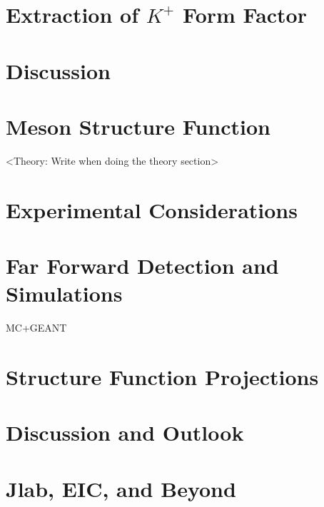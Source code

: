 \documentclass[
]{report}
\begin{document}
\hypertarget{Section-8.4}{%
\section{\texorpdfstring{Extraction of \(K^{+}\) Form
Factor}{Extraction of K\^{}\{+\} Form Factor}}\label{Section-8.4}}

\hypertarget{Section-8.5}{%
\section{Discussion}\label{Section-8.5}}

\label{Chapter-9}



\hypertarget{Section-9.1}{%
\section{Meson Structure Function}\label{Section-9.1}}

\textless Theory: Write when doing the theory section\textgreater{}

\hypertarget{Section-9.2}{%
\section{Experimental Considerations}\label{Section-9.2}}

\hypertarget{Section-9.3}{%
\section{Far Forward Detection and Simulations}\label{Section-9.3}}

MC+GEANT

\hypertarget{Section-9.4}{%
\section{Structure Function Projections}\label{Section-9.4}}

\hypertarget{Section-9.5}{%
\section{Discussion and Outlook}\label{Section-9.5}}

\label{Chapter-10}

\hypertarget{Section-10.1}{%
\section{Jlab, EIC, and Beyond}\label{Section-10.1}}
\end{document}
